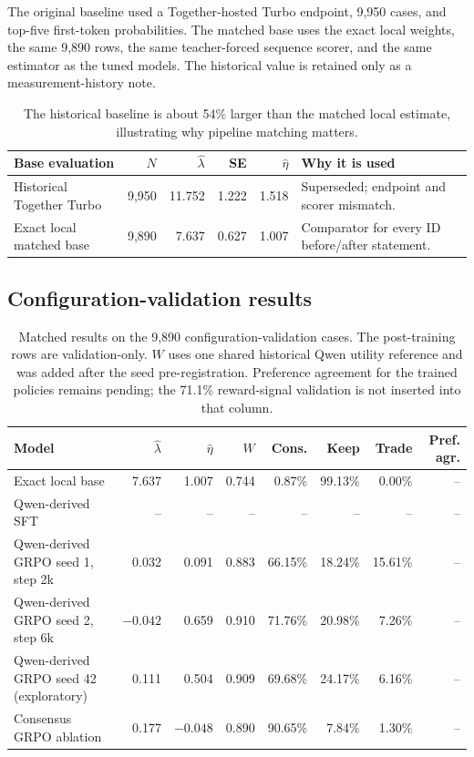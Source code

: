 \documentclass[11pt,letterpaper]{article}
\begin{document}
The original baseline used a Together-hosted Turbo endpoint, 9,950 cases, and
top-five first-token probabilities. The matched base uses the exact local
weights, the same 9,890 rows, the same teacher-forced sequence scorer, and the
same estimator as the tuned models. The historical value is retained only as a
measurement-history note.

\begin{table}[htbp]
\centering
\small
\begin{tabular}{lrrrrp{}}
\toprule
Base evaluation & $N$ & $\widehat\lambda$ & SE & $\widehat\eta$ & Why it is used \\
\midrule
Historical Together Turbo & 9,950 & 11.752 & 1.222 & 1.518 & Superseded; endpoint and scorer mismatch. \\
Exact local matched base & 9,890 & 7.637 & 0.627 & 1.007 & Comparator for every ID before/after statement. \\
\bottomrule
\end{tabular}
\caption{The historical baseline is about 54\% larger than the matched local
estimate, illustrating why pipeline matching matters.}
\label{tab:base-history}
\end{table}

\subsection{Configuration-validation results}

\begin{table}[htbp]
\centering
\scriptsize
\begin{tabular}{lrrrrrrr}
\toprule
Model & $\widehat\lambda$ & $\widehat\eta$ & $W$ & Cons. & Keep & Trade & Pref. agr. \\
\midrule
Exact local base & 7.637 & 1.007 & 0.744 & 0.87\% & 99.13\% & 0.00\% & -- \\
Qwen-derived SFT & -- & -- & -- & -- & -- & -- & -- \\
Qwen-derived GRPO seed 1, step 2k & 0.032 & 0.091 & 0.883 & 66.15\% & 18.24\% & 15.61\% & -- \\
Qwen-derived GRPO seed 2, step 6k & $-0.042$ & 0.659 & 0.910 & 71.76\% & 20.98\% & 7.26\% & -- \\
Qwen-derived GRPO seed 42 (exploratory) & 0.111 & 0.504 & 0.909 & 69.68\% & 24.17\% & 6.16\% & -- \\
Consensus GRPO ablation & 0.177 & $-0.048$ & 0.890 & 90.65\% & 7.84\% & 1.30\% & -- \\
\bottomrule
\end{tabular}
\caption{Matched results on the 9,890 configuration-validation cases. The
post-training rows are validation-only. $W$ uses one shared historical Qwen
utility reference and was added after the seed pre-registration. Preference
agreement for the trained policies remains pending; the 71.1\% reward-signal
validation is not inserted into that column.}
\label{tab:id-results}
\end{table}
\end{document}

